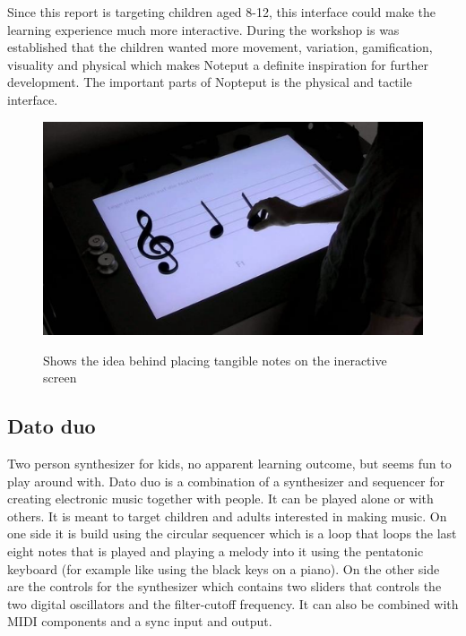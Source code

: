Since this report is targeting children aged 8-12, this interface could make the learning experience much more interactive. During the workshop is was established that the children wanted more movement, variation, gamification, visuality and physical which makes Noteput a definite inspiration for further development. The important parts of Nopteput is the physical and tactile interface.   
\begin{figure}[H]
	\centering
	\includegraphics[width=0.7\linewidth]{figure/Analysis/noteput}
	\label{fig:noteput}
	\caption{Shows the idea behind placing tangible notes on the ineractive screen}
\end{figure}


\subsection{Dato duo} 
Two person synthesizer for kids, no apparent learning outcome, but seems fun to play around with. Dato duo is a combination of a synthesizer and sequencer for creating electronic music together with people. It can be played alone or with others. It is meant to target children and adults interested in making music. On one side it is build using the circular sequencer which is a loop that loops the last eight notes that is played and playing a melody into it using the pentatonic keyboard (for example like using the black keys on a piano). On the other side are the controls for the synthesizer which contains two sliders that controls the two digital oscillators and the filter-cutoff frequency. It can also be combined with MIDI components and a sync input and output. 


